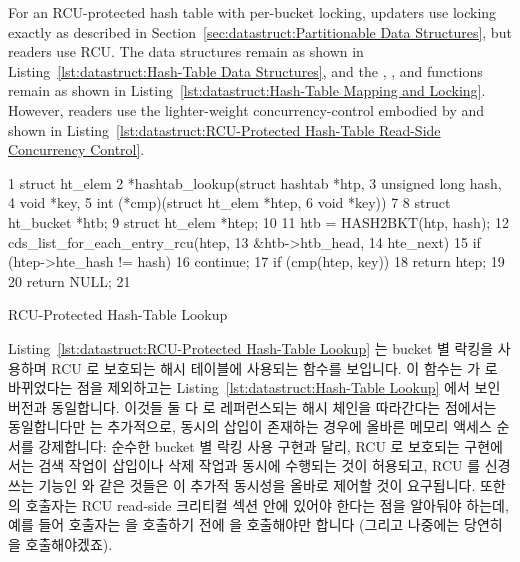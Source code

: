 For an RCU-protected hash table with per-bucket locking,
updaters use locking exactly as described in
Section~\ref{sec:datastruct:Partitionable Data Structures},
but readers use RCU.
The data structures remain as shown in
Listing~\ref{lst:datastruct:Hash-Table Data Structures},
and the , , and 
functions remain as shown in
Listing~\ref{lst:datastruct:Hash-Table Mapping and Locking}.
However, readers use the lighter-weight concurrency-control embodied
by  and 
shown in
Listing~\ref{lst:datastruct:RCU-Protected Hash-Table Read-Side Concurrency Control}.
\fi

\begin{listing}[tb]
{ \scriptsize
\begin{verbbox}
 1 struct ht_elem
 2 *hashtab_lookup(struct hashtab *htp,
 3                 unsigned long hash,
 4                 void *key,
 5                 int (*cmp)(struct ht_elem *htep,
 6                            void *key))
 7 {
 8   struct ht_bucket *htb;
 9   struct ht_elem *htep;
10 
11   htb = HASH2BKT(htp, hash);
12   cds_list_for_each_entry_rcu(htep,
13                               &htb->htb_head,
14                               hte_next) {
15     if (htep->hte_hash != hash)
16       continue;
17     if (cmp(htep, key))
18       return htep;
19   }
20   return NULL;
21 }
\end{verbbox}
}
\centering
\theverbbox
\caption{RCU-Protected Hash-Table Lookup}
\label{lst:datastruct:RCU-Protected Hash-Table Lookup}
\end{listing}

Listing~\ref{lst:datastruct:RCU-Protected Hash-Table Lookup} 는 bucket 별
락킹을 사용하며 RCU 로 보호되는 해시 테이블에 사용되는 
함수를 보입니다.
이 함수는  가 
로 바뀌었다는 점을 제외하고는
Listing~\ref{lst:datastruct:Hash-Table Lookup} 에서 보인 버전과 동일합니다.
이것들 둘 다  로 레퍼런스되는 해시 체인을 따라간다는 점에서는
동일합니다만  는 추가적으로, 동시의 삽입이
존재하는 경우에 올바른 메모리 액세스 순서를 강제합니다:
순수한 bucket 별 락킹 사용 구현과 달리, RCU 로 보호되는 구현에서는 검색 작업이
삽입이나 삭제 작업과 동시에 수행되는 것이 허용되고, RCU 를 신경쓰는 기능인
 와 같은 것들은 이 추가적 동시성을 올바로
제어할 것이 요구됩니다.
또한  의 호출자는 RCU read-side 크리티컬 섹션 안에 있어야
한다는 점을 알아둬야 하는데, 예를 들어 호출자는  을
호출하기 전에  을 호출해야만 합니다 (그리고 나중에는
당연히  을 호출해야겠죠).
\iffalse

